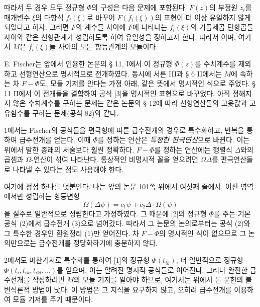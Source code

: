 따라서 두 경우 모두 정규형 \(\Phi\)의 구성은 다음 문제에 포함된다. \(F(z)\)의 부정원 \(z_i\)를 매개변수 \(\xi\)의 다항식 \(f_i(\xi)\)로 바꾸어 \(F(f_i(\xi))\)의 표현이 더 이상 유일하지 않게 되었다고 하자. 그러면 \(F\)의 계수들 사이에 \(F\)에 나타나는 \(f_i(\xi)\)의 거듭제곱 단항곱들 사이와 같은 선형관계가 성립하도록 하여 유일성을 정하고자 한다. 따라서
이며, 여기서 \(M\)은 \(f_i(\xi)\)들 사이의 모든 항등관계의 모듈이다.

E. Fischer는 앞에서 인용한 논문의 § 11, I에서 이 정규형 \(\Phi(z)\)를 수치계수를 제외하고 선형연산으로 명시적으로 전개하였다. 동시에 서론 III과 § 6 II에서는 \(M\)에 속하는 차 \(F-\Phi\)도, 모듈 기저를 안다는 가정 아래, 같은 뜻에서 명시적인 식으로 주었다. § 11 II에서 이 전개들을 결합하여 공식 [3]을 명시적인 표현으로 바꾸었다. 아직 정해지지 않은 수치계수를 구하는 문제는 같은 논문의 § 12에 따라 선형연산들의 고윳값과 고유함수를 구하는 문제(공식 82)와 같다.

1에서는 Fischer의 공식들을 편극형에 따른 급수전개의 경우로 특수화하고, 반복을 통하여 급수전개를 얻는다. 이때 \(\Phi\)를 정하는 연산은 \emph{특정한 편극연산}으로 바뀐다. 이는 위에서 말한 종래의 서술보다 훨씬 정확하다. \(F-\Phi\)를 정하는 연산에는 행렬식 \(\Delta\)와의 곱셈과 \(\Omega\)-연산이 섞여 나타난다. 통상적인 비명시적 꼴을 얻으려면 \(\Omega\Delta\)를 편극연산들로 나타낼 수 있다는 점도 사용해야 한다.

여기에 정정 하나를 덧붙인다. 나는 앞의 논문 101쪽 위에서 여섯째 줄에서, 이진 영역에서만 성립하는 항등변형
\[
\Omega(\Delta\psi)=c_1\psi+c_2\Delta\cdot\Omega(\psi)
\]
을 실수로 일반적으로 성립한다고 가정하였다. 그 때문에 [2]의 정규형 \(\Phi\)를 주는 기본공식 (2)에서 급수전개 (3)으로 넘어갔다. 따라서 그 논문의 논의로부터는 공식 (2)와 그 특수한 경우인 환원정리 (1)만 얻어진다. 차 \(F-\Phi\)의 명시적인 식이 없으므로 그 논의만으로는 급수전개를 정당화하기에 충분하지 않다.

2에서도 마찬가지로 특수화를 통하여 [1]의 정규형 \(\Phi(t_{ik})\), 더 일반적으로 정규형 \(\Phi(t_i,t_{ik},t_{ikl},\ldots)\)를 얻으며, 이는 알려진 명시적 공식들로 이어진다. 그러나 완전한 급수전개를 작성하려면 \(M\)의 모듈 기저를 알아야 하므로, 여기서는 위에서 든 문헌의 불변식론적 방법이 낫다. 이 방법은 그 지식을 요구하지 않고, 오히려 급수전개를 이용하여 모듈 기저를 주기 때문이다.

